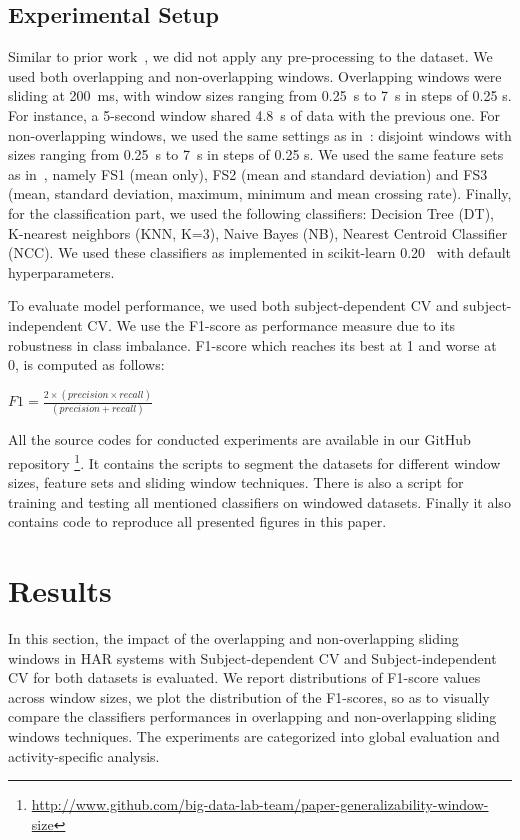 \documentclass[sensors,article,submit,moreauthors,pdftex]{Definitions/mdpi}
\begin{document}
\subsection{Experimental Setup} \label{sec:experiment setup}
Similar to prior work~\cite{banos2014window}, we did not apply any pre-processing to the dataset. We used both overlapping and non-overlapping windows. Overlapping windows were sliding at 200~ms, with window sizes ranging from 0.25~s to 7~s in steps of 0.25 s. For instance, a 5-second window shared 4.8~s of data with the previous one. For non-overlapping windows, we used the same settings as in~\cite{banos2014window}: disjoint windows with sizes ranging from 0.25~s to 7~s in steps of 0.25 s. We used the same feature sets as in~\cite{banos2014window}, namely FS1 (mean only), FS2 (mean and standard deviation) and FS3 (mean, standard deviation, maximum, minimum and mean crossing rate). Finally, for the classification part, we used the following classifiers: Decision Tree (DT), K-nearest neighbors (KNN, K=3), Naive Bayes (NB), Nearest Centroid Classifier (NCC). We used these classifiers as implemented in scikit-learn 0.20~\cite{pedregosa2011scikit} with default hyperparameters.
 
 To evaluate model performance, we used both subject-dependent CV and subject-independent CV. We use the F1-score as performance measure due to its robustness in class imbalance. F1-score which reaches its best at 1 and worse at 0, is computed as follows:
 \begin{center}
      $F1= \frac{2\times(precision \times recall)}{(precision + recall)}$
 \end{center}

All the source codes for conducted experiments are available in our GitHub repository \footnote{\url{http://www.github.com/big-data-lab-team/paper-generalizability-window-size}}. It contains the scripts to segment the datasets for different window sizes, feature sets and sliding window techniques. There is also a script for training and testing all mentioned classifiers on windowed datasets. Finally it also contains code to reproduce all presented figures in this paper.
\section{Results} \label{sec:result}
In this section, the impact of the overlapping and non-overlapping sliding windows in HAR systems with Subject-dependent CV and Subject-independent CV for both datasets is evaluated. We report distributions of  F1-score values across window sizes, we plot the distribution of the F1-scores, so as to  visually compare the classifiers performances in overlapping and non-overlapping sliding windows techniques. The experiments are categorized into global evaluation and activity-specific analysis.
\end{document}
